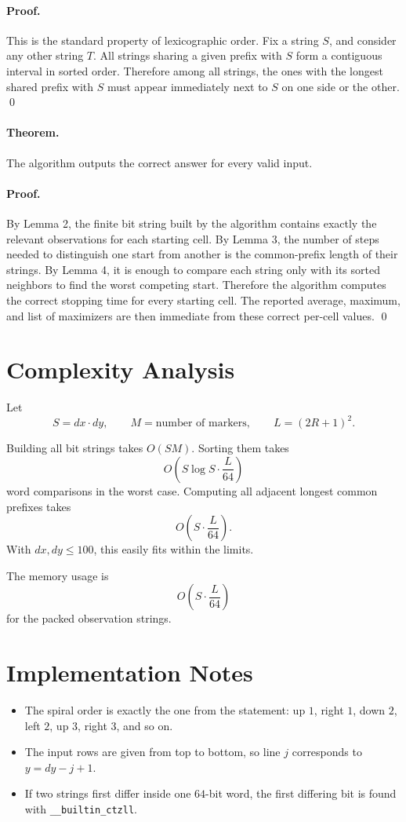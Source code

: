 \documentclass[11pt]{article}
\begin{document}
\paragraph{Proof.}
This is the standard property of lexicographic order. Fix a string $S$, and consider any other string $T$.
All strings sharing a given prefix with $S$ form a contiguous interval in sorted order. Therefore among all
strings, the ones with the longest shared prefix with $S$ must appear immediately next to $S$ on one
side or the other. \qed

\paragraph{Theorem.}
The algorithm outputs the correct answer for every valid input.

\paragraph{Proof.}
By Lemma 2, the finite bit string built by the algorithm contains exactly the relevant observations for
each starting cell. By Lemma 3, the number of steps needed to distinguish one start from another is the
common-prefix length of their strings. By Lemma 4, it is enough to compare each string only with its
sorted neighbors to find the worst competing start. Therefore the algorithm computes the correct stopping
time for every starting cell. The reported average, maximum, and list of maximizers are then immediate
from these correct per-cell values. \qed

\section*{Complexity Analysis}

Let
\[
    S = dx \cdot dy,\qquad M = \text{number of markers},\qquad L = (2R+1)^2.
\]

Building all bit strings takes $O(SM)$. Sorting them takes
\[
    O\!\left(S \log S \cdot \frac{L}{64}\right)
\]
word comparisons in the worst case. Computing all adjacent longest common prefixes takes
\[
    O\!\left(S \cdot \frac{L}{64}\right).
\]
With $dx,dy \le 100$, this easily fits within the limits.

The memory usage is
\[
    O\!\left(S \cdot \frac{L}{64}\right)
\]
for the packed observation strings.

\section*{Implementation Notes}

\begin{itemize}[leftmargin=*]
    \item The spiral order is exactly the one from the statement: up $1$, right $1$, down $2$, left $2$,
    up $3$, right $3$, and so on.
    \item The input rows are given from top to bottom, so line $j$ corresponds to $y = dy-j+1$.
    \item If two strings first differ inside one $64$-bit word, the first differing bit is found with
    \texttt{\_\_builtin\_ctzll}.
\end{itemize}
\end{document}
